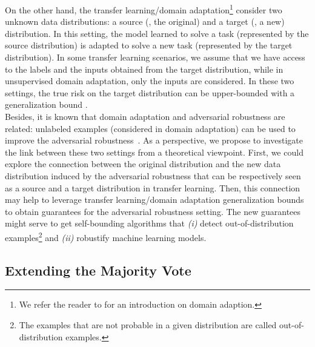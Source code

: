 On the other hand, the transfer learning/domain adaptation\footnote{We refer the reader to \citet{RedkoMorvantHabrardSebbanBennani2019,RedkoMorvantHabrardSebbanBennani2020} for an introduction on domain adaption.} consider two unknown data distributions: a source (\ie, the original) and a target (\ie, a new) distribution.
In this setting, the model learned to solve a task (represented by the source distribution) is adapted to solve a new task (represented by the target distribution).
In some transfer learning scenarios, we assume that we have access to the labels and the inputs obtained from the target distribution, while in unsupervised domain adaptation, only the inputs are considered.
In these two settings, the true risk on the target distribution can be upper-bounded with a generalization bound \citep[see \eg,][]{BenDavidBlitzerCrammerKuleszaPereiraVaughan2010,McNamaraBalcan2017,GalantiWolfHazan2016,GermainHabrardLavioletteMorvant2020}.\\

Besides, it is known that domain adaptation and adversarial robustness are related: unlabeled examples (considered in domain adaptation) can be used to improve the adversarial robustness~\citep{CarmonRaghunathanSchmidtDuchiLiang2019,AlayracUesatoHuangFawziStanforthKohli2019,DengZhangGhorbaniZou2021}.
As a perspective, we propose to investigate the link between these two settings from a theoretical viewpoint.
First, we could explore the connection between the original distribution and the new data distribution induced by the adversarial robustness that can be respectively seen as a source and a target distribution in transfer learning.
Then, this connection may help to leverage transfer learning/domain adaptation generalization bounds to obtain guarantees for the adversarial robustness setting.
The new guarantees might serve to get self-bounding algorithms that {\it (i)} detect out-of-distribution examples\footnote{The examples that are not probable in a given distribution are called out-of-distribution examples.} and {\it (ii)} robustify machine learning models.

\subsection*{Extending the Majority Vote}

